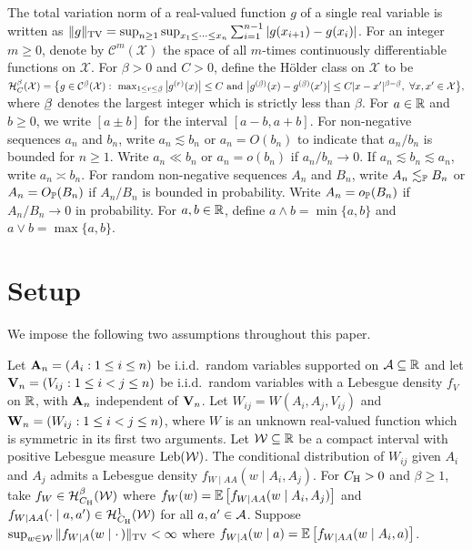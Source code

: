 The total variation norm of a
real-valued function $g$ of a single real variable is
written as
$\|g\|_\TV = \sup_{n \geq 1} \sup_{x_1 \leq \cdots \leq x_n}
\sum_{i=1}^{n-1} |g(x_{i+1}) - g(x_i)|$.
For an integer $m\geq 0$,
denote by $\mathcal{C}^m(\mathcal{X})$
the space of all $m$-times continuously differentiable functions
on $\mathcal{X}$.
For $\beta > 0$ and $C>0$,
define the H\"{o}lder class on $\mathcal{X}$ to be
$\cH^\beta_C(\cX)
=
\big\{
  g \in \cC^{\flbeta}(\cX): \
  \max_{1 \leq r \leq \flbeta}
  \big| g^{(r)}(x) \big| \leq C
  \text{ and }
  \big| g^{(\flbeta)}(x) - g^{(\flbeta)}(x') \big|
  \leq C |x-x'|^{\beta - \flbeta}, \
  \forall x, x' \in \cX
\big\},
$
where $\flbeta$ denotes the largest integer
which is strictly less than $\beta$.
For $a \in \R$ and $b \geq 0$,
we write $[a \pm b]$ for the interval $[a-b, a+b]$.
For non-negative sequences
$a_n$ and $b_n$, write
$a_n \lesssim b_n$ or $a_n = O(b_n)$
to indicate that
$a_n / b_n$ is bounded for $n\geq 1$.
Write $a_n \ll b_n$ or $a_n = o(b_n)$ if $a_n / b_n \to 0$.
If $a_n \lesssim b_n \lesssim a_n$,
write $a_n \asymp b_n$.
For random non-negative sequences
$A_n$ and $B_n$, write
$A_n \lesssim_\P B_n$ or $A_n = O_\P(B_n)$ if
$A_n / B_n$ is bounded in probability.
Write $A_n = o_\P(B_n)$ if $A_n / B_n \to 0$ in probability.
For $a,b \in \R$, define $a\wedge b=\min\{a,b\}$ and
$a \vee b = \max\{a,b\}$.

\section{Setup}\label{sec:kernel_setup}

We impose the following two assumptions throughout this paper.
%
\begin{assumption}[Data generation]\label{ass:kernel_data}\onehalfspacing
  Let $\bA_n = (A_i: 1 \leq i \leq n)$ be i.i.d.\
  random variables supported on $\cA \subseteq \R$
  and let $\bV_n = (V_{i j}: 1 \leq i < j \leq n)$
  be i.i.d.\ random variables with a Lebesgue density $f_V$ on $\R$,
  with $\bA_n$ independent of $\bV_n$.
  Let $W_{i j} = W(A_i, A_j, V_{i j})$
  and $\bW_n = (W_{i j}: 1 \leq i < j \leq n)$,
  where $W$ is an unknown real-valued function
  which is symmetric in its first two arguments.
  Let $\cW \subseteq \R$ be a compact interval
  with positive Lebesgue measure $\Leb(\cW)$.
  The conditional distribution
  of $W_{i j}$ given $A_i$ and $A_j$
  admits a Lebesgue density $f_{W \mid AA}(w \mid A_i, A_j)$.
  For $\CH > 0$ and $\beta \geq 1$,
  take $f_W \in \cH^\beta_{\CH}(\cW)$ where
  $f_{W}(w) = \E\left[f_{W \mid AA}(w \mid A_i,A_j)\right]$
  and
  $f_{W \mid AA}(\cdot \mid a, a') \in \cH^1_{\CH}(\cW)$
  for all $a,a' \in \cA$.
  Suppose
  $\sup_{w \in \cW} \|f_{W \mid A}(w \mid \cdot\,)\|_\TV <\infty$ where
  $f_{W \mid A}(w \mid a) = \E\left[f_{W \mid AA}(w \mid A_i,a)\right]$.
\end{assumption}

